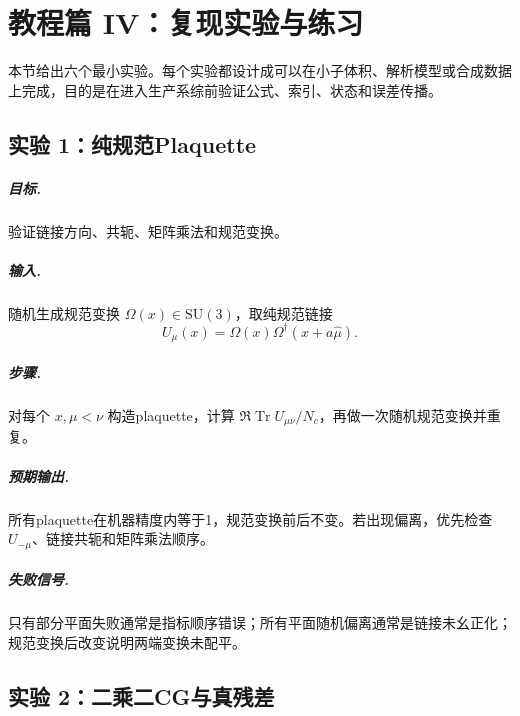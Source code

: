 \documentclass[UTF8,12pt,a4paper,twoside,openany]{ctexbook}
\newcommand{\Tr}{\operatorname{Tr}}
\begin{document}
\chapter{教程篇 IV：复现实验与练习}
\label{sec:reproduction-labs}

本节给出六个最小实验。每个实验都设计成可以在小子体积、解析模型或合成数据上完成，目的是在进入生产系综前验证公式、索引、状态和误差传播。

\section{实验 1：纯规范Plaquette}

\paragraph{目标.} 验证链接方向、共轭、矩阵乘法和规范变换。

\paragraph{输入.} 随机生成规范变换 \(\Omega(x)\in\mathrm{SU}(3)\)，取纯规范链接
\begin{equation}
  U_\mu(x)=\Omega(x)\Omega^\dagger(x+a\hat\mu).
  \label{eq:lab-pure-gauge}
\end{equation}

\paragraph{步骤.} 对每个 \(x,\mu<\nu\) 构造plaquette，计算 \(\Re\Tr U_{\mu\nu}/N_c\)，再做一次随机规范变换并重复。

\paragraph{预期输出.} 所有plaquette在机器精度内等于1，规范变换前后不变。若出现偏离，优先检查 \(U_{-\mu}\)、链接共轭和矩阵乘法顺序。

\paragraph{失败信号.} 只有部分平面失败通常是指标顺序错误；所有平面随机偏离通常是链接未幺正化；规范变换后改变说明两端变换未配平。

\section{实验 2：二乘二CG与真残差}
\end{document}
